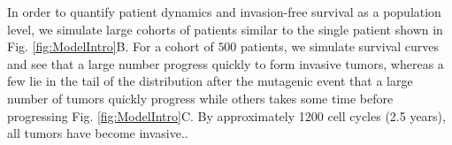 \documentclass[11pt]{article}
\begin{document}
\par 
In order to quantify patient dynamics and invasion-free survival as a population level, we simulate large cohorts of patients similar to the single patient shown in  Fig. \ref{fig:ModelIntro}B. For a cohort of $500$ patients, we simulate survival curves and see that a large number progress quickly to form invasive tumors, whereas a few lie in the tail of the distribution after the mutagenic event that a large number of tumors quickly progress while others takes some time before progressing Fig. \ref{fig:ModelIntro}C. By approximately 1200 cell cycles (2.5 years), all tumors have become invasive..



\end{document}
